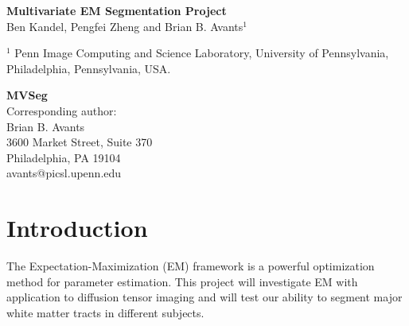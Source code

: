 \documentclass[11pt,english]{article}
\begin{document}
\normalem

\vspace*{5cm}

\begin{center}
{\Large \bf Multivariate EM Segmentation Project} \\
\vspace*{0.5cm}
{\normalsize Ben Kandel, Pengfei Zheng and Brian B. Avants$^1$} \\
\begin{singlespace} 
{\scriptsize  $^1$ Penn Image Computing and Science Laboratory, University of Pennsylvania, Philadelphia, Pennsylvania,  USA.}
\end{singlespace}
\end{center}

\vfill

\begin{singlespace} 
\scriptsize
\flushleft
{\bf MVSeg}\\
Corresponding author: \\
Brian B. Avants\\
3600 Market Street, Suite 370\\
Philadelphia, PA  19104\\
avants@picsl.upenn.edu\\
\end{singlespace} 
\clearpage
\begin{abstract} 
Neuroanatomical coordinate systems are essential for the
interpretation of structural and functional imaging studies.  However,
manual delineation of the neuroanatomical complex is time consuming
and prone to random performance variability.  This work describes an
open source, image-based approach to white matter parcellation which
uses training data to propagate structural labelings to individual
images.  The Bayesian formulation of the segmentation problem is
solved using the Expectation Maximization (EM) algorithm with a
variety of different multivariate distance metrics.  We evaluate our
ability to segment DTI data based on comparison with
registration-based approaches and biological validity of results.
\end{abstract}

\section{Introduction}
The Expectation-Maximization (EM) framework \citep{Dempster1977} is a
powerful optimization method for parameter estimation.  This project
will investigate EM with application to diffusion tensor imaging and
will test our ability to segment major white matter tracts in
different subjects.   
\end{document}
